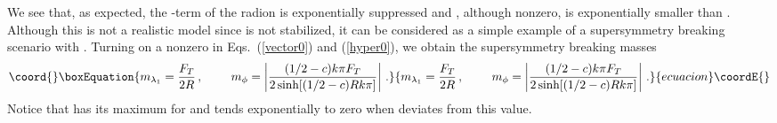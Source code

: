 \documentclass[a4paper,12pt]{article}
\begin{document}
We see that, as expected,  
the \coordHE{}-term of the radion is exponentially suppressed
and \coordHE{}, although nonzero, is exponentially smaller
than \coordHE{}.
Although
this is not a realistic model since \coordHE{} is not stabilized,
it can be considered as a simple example of 
a supersymmetry breaking scenario with  \coordHE{}.
Turning on a nonzero \coordHE{}
in Eqs.~(\ref{vector0}) and (\ref{hyper0}),
we obtain the supersymmetry breaking masses
\begin{equation}\coord{}\boxEquation{
m_{\lambda_1}=\frac{F_T}{2R}\, , 
\ \ \ \ \ \ \ 
m_\phi=\left|\frac{(1/2-c)k\pi F_T}{2\sinh[(1/2-c)Rk\pi]}\right|\, .
\label{softmasses}
}{
m_{\lambda_1}=\frac{F_T}{2R}\, , 
\ \ \ \ \ \ \ 
m_\phi=\left|\frac{(1/2-c)k\pi F_T}{2\sinh[(1/2-c)Rk\pi]}\right|\, .
}{ecuacion}\coordE{}\end{equation}
Notice that \myHighlight{$m_\phi$}\coordHE{}  has its maximum for \coordHE{} and tends exponentially
to zero   when \myHighlight{$c$}\coordHE{} deviates  from this value. 
\end{document}
